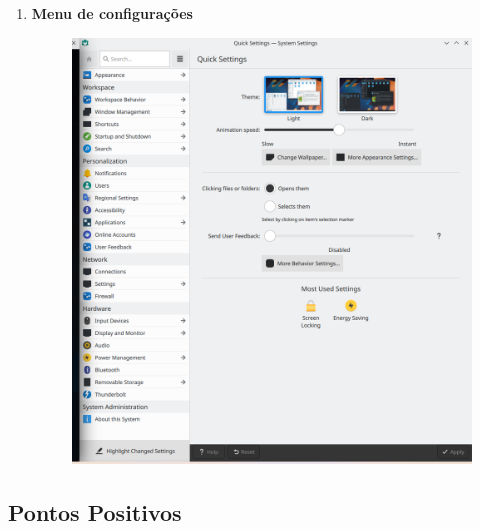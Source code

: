 \documentclass[10pt]{article}
\begin{document}
\begin{enumerate}
\begin{figure}[h]
        \centering
    \end{figure}
    \newpage
    \item \textbf{Menu de configurações}
    \begin{figure}[h]
        \includegraphics[width=14cm]{settings}
        \centering
    \end{figure}
\end{enumerate}

\subsection{Pontos Positivos} \hfill
\end{document}
